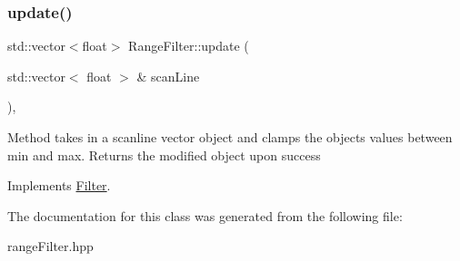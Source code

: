 \subsubsection{\texorpdfstring{update()}{update()}}
{\footnotesize\ttfamily std\+::vector$<$float$>$ Range\+Filter\+::update (\begin{DoxyParamCaption}\item[{std\+::vector$<$ float $>$ \&}]{scan\+Line }\end{DoxyParamCaption})\hspace{0.3cm}{\ttfamily [inline]}, {\ttfamily [virtual]}}

Method takes in a scanline vector object and clamps the object\textquotesingle{}s values between min and max. Returns the modified object upon success 

Implements \hyperlink{class_filter}{Filter}.



The documentation for this class was generated from the following file\+:\begin{DoxyCompactItemize}
\item 
range\+Filter.\+hpp\end{DoxyCompactItemize}
